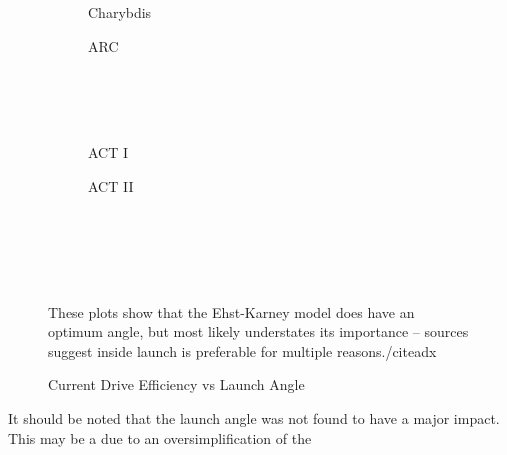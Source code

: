 \begin{figure*}[h!]
    \centering
    \hfill
    \begin{subfigure}[t]{0.4\textwidth}
        \centering
    \begin{adjustbox}{width=\textwidth}
      \Large
      
    \end{adjustbox}
        \caption{Charybdis}
    \end{subfigure}
    \hfill
    \begin{subfigure}[t]{0.4\textwidth}
        \centering
    \begin{adjustbox}{width=\textwidth}
      \Large
      
    \end{adjustbox}
        \caption{ARC}
    \end{subfigure}
    \hfill \hfill ~\\ ~\\ ~\\
    \hfill
    \begin{subfigure}[t]{0.4\textwidth}
        \centering
    \begin{adjustbox}{width=\textwidth}
      \Large
      
    \end{adjustbox}
        \caption{ACT I}
    \end{subfigure}
    \hfill
    \begin{subfigure}[t]{0.4\textwidth}
        \centering
    \begin{adjustbox}{width=\textwidth}
      \Large
      
    \end{adjustbox}
        \caption{ACT II}
    \end{subfigure}
    \hfill \hfill ~\\ ~\\ ~\\
    \caption{Current Drive Efficiency vs Launch Angle}
    \label{fig:launch_angle} ~ \\
    \small{ These plots show that the Ehst-Karney model does have an optimum angle, but most likely understates its importance -- sources suggest inside launch is preferable for multiple reasons./cite{adx} }
\end{figure*}

It should be noted that the launch angle was not found to have a major impact. This may be a due to an oversimplification of the 

%
